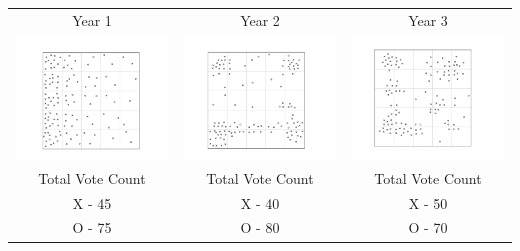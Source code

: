 \begin{tabular}{c c c }

Year 1 & Year 2 & Year 3 \\
 \includegraphics[width=2in]{assets/Gerrymandering/Gerry5x5-120-1.pdf} &  \includegraphics[width=2in]{assets/Gerrymandering/Gerry5x5-120-2.pdf} &  \includegraphics[width=2in]{assets/Gerrymandering/Gerry5x5-120-3.pdf}\\
 Total Vote Count &  Total Vote Count &  Total Vote Count\\
 X -  45& X - 40 & X  - 50\\
 O - 75 & O - 80 & O - 70
 \end{tabular}